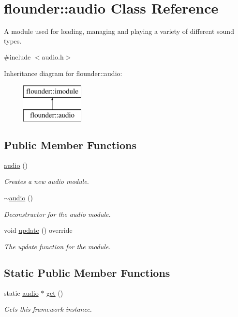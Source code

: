 \hypertarget{classflounder_1_1audio}{}\section{flounder\+:\+:audio Class Reference}
\label{classflounder_1_1audio}


A module used for loading, managing and playing a variety of different sound types.  




{\ttfamily \#include $<$audio.\+h$>$}

Inheritance diagram for flounder\+:\+:audio\+:\begin{figure}[H]
\begin{center}
\leavevmode
\includegraphics[height=2.000000cm]{classflounder_1_1audio}
\end{center}
\end{figure}
\subsection*{Public Member Functions}
\begin{DoxyCompactItemize}
\item 
\hyperlink{classflounder_1_1audio_a0aabbb226f542847145d89adb1144c16}{audio} ()
\begin{DoxyCompactList}\small\item\em Creates a new audio module. \end{DoxyCompactList}\item 
\hyperlink{classflounder_1_1audio_afb4d3bbb9ae399385a3abfe6e4e6d7ee}{$\sim$audio} ()
\begin{DoxyCompactList}\small\item\em Deconstructor for the audio module. \end{DoxyCompactList}\item 
void \hyperlink{classflounder_1_1audio_aabff6a1996b8571404023b6ac17009b6}{update} () override
\begin{DoxyCompactList}\small\item\em The update function for the module. \end{DoxyCompactList}\end{DoxyCompactItemize}
\subsection*{Static Public Member Functions}
\begin{DoxyCompactItemize}
\item 
static \hyperlink{classflounder_1_1audio}{audio} $\ast$ \hyperlink{classflounder_1_1audio_ac827774b8855e8a921ef9141c2515df8}{get} ()
\begin{DoxyCompactList}\small\item\em Gets this framework instance. \end{DoxyCompactList}\end{DoxyCompactItemize}
